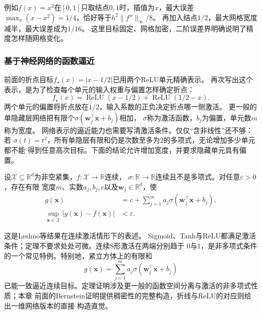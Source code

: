 例如$f(x)=x^2$在$[0,1]$只取结点$0,1$时，插值为$x$，最大误差
$\max_x(x-x^2)=1/4$，恰好等于$h^2\lVert f''\rVert_\infty/8$。
再加入结点$1/2$，最大网格宽度减半，最大误差成为$1/16$。
这里目标固定、网格加密，二阶误差界明确说明了精度怎样随网格变化。

\subsubsection{基于神经网络的函数逼近}
\label{sec:functional-neural-approximation}

前面的折点目标$f_\star(x)=|x-1/2|$已用两个ReLU单元精确表示。
再次写出这个表示，是为了检查每个单元的输入权重与偏置怎样确定折点：
\[
 f_\star(x)=\operatorname{ReLU}(x-1/2)+\operatorname{ReLU}(1/2-x).
\]
两个单元的偏置将折点放在$1/2$，输入系数的正负决定折点哪一侧激活。
更一般的单隐藏层网络把有限个$\sigma(\bm w_j^\top\bm x+b_j)$相加，
$\sigma$称为激活函数，$b_j$为偏置，单元数$m$称为宽度。
网络表示的逼近能力也需要写清激活条件。仅仅“含非线性”还不够：若
$\sigma(t)=t^2$，所有单隐层有限和仍是次数至多为$2$的多项式，无论增加多少单元都不能
得到任意高次目标。下面的结论允许增加宽度，并要求隐藏单元具有偏置。

\begin{theorem}[单隐藏层的通用逼近]
\label{thm:functional-universal-approximation}
设$\mathcal X\subseteq\mathbb R^d$为非空紧集，$f:\mathcal X\to\mathbb R$连续，
$\sigma:\mathbb R\to\mathbb R$连续且不是多项式。对任意$\varepsilon>0$，存在有限
宽度$m$、实数$a_j,b_j,c$以及$\bm w_j\in\mathbb R^d$，使
\begin{equation}
 \begin{aligned}
 g(\bm x)&=c+\sum_{j=1}^m a_j\sigma(\bm w_j^{\top}\bm x+b_j),\\
 \sup_{\bm x\in\mathcal X}|g(\bm x)-f(\bm x)|&<\varepsilon.
 \end{aligned}
 \label{eq:functional-universal-approximation}
\end{equation}
\end{theorem}

这是Leshno等结果在连续激活情形下的表述。
Sigmoid、Tanh与ReLU都满足激活条件；定理不要求处处可微。连续S形激活在两端分别趋于
$0$与$1$，是非多项式条件的一个常见特例。特别地，紧立方体上的有限和
\begin{equation}
 g(\bm x)=\sum_{j=1}^m a_j\sigma(\bm w_j^{\top}\bm x+b_j)
 \label{eq:functional-sigmoidal-network}
\end{equation}
已能一致逼近连续目标。定理证明涉及更一般的函数空间分离与激活的非多项式性质；本章
前面的Bernstein证明提供稠密性的完整构造，折线与ReLU的对应则给出一维网络版本的直接
构造直觉。

